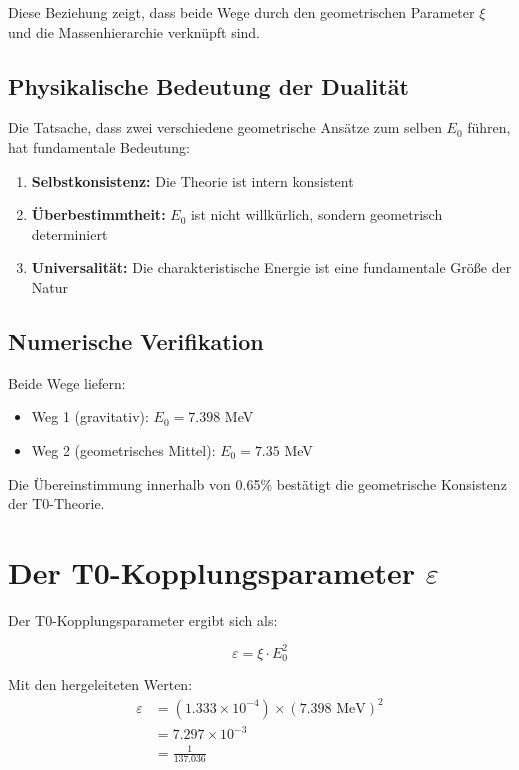 \documentclass[12pt,a4paper]{article}
\theoremstyle{definition}
\begin{document}
	Diese Beziehung zeigt, dass beide Wege durch den geometrischen Parameter $\xi$ und die Massenhierarchie verkn\"upft sind.
	
	\subsection{Physikalische Bedeutung der Dualit\"at}
	
	Die Tatsache, dass zwei verschiedene geometrische Ans\"atze zum selben $E_0$ f\"uhren, hat fundamentale Bedeutung:
	
	\begin{enumerate}
		\item \textbf{Selbstkonsistenz:} Die Theorie ist intern konsistent
		\item \textbf{\"Uberbestimmtheit:} $E_0$ ist nicht willk\"urlich, sondern geometrisch determiniert
		\item \textbf{Universalit\"at:} Die charakteristische Energie ist eine fundamentale Gr\"o\ss e der Natur
	\end{enumerate}
	
	\subsection{Numerische Verifikation}
	
	Beide Wege liefern:
	\begin{itemize}
		\item Weg 1 (gravitativ): $E_0 = 7.398$ MeV
		\item Weg 2 (geometrisches Mittel): $E_0 = 7.35$ MeV
	\end{itemize}
	
	Die \"Ubereinstimmung innerhalb von 0.65\% best\"atigt die geometrische Konsistenz der T0-Theorie.
	
	\section{Der T0-Kopplungsparameter $\varepsilon$}
	
	Der T0-Kopplungsparameter ergibt sich als:
	
	\begin{equation}
		\varepsilon = \xi \cdot E_0^2
	\end{equation}
	
	Mit den hergeleiteten Werten:
	\begin{align}
		\varepsilon &= (1.333 \times 10^{-4}) \times (7.398 \text{ MeV})^2\\
		&= 7.297 \times 10^{-3}\\
		&= \frac{1}{137.036}
	\end{align}
	
\end{document}
